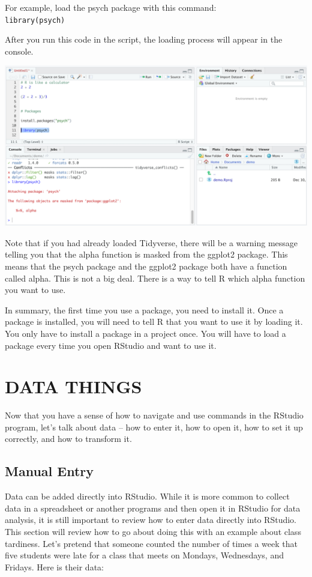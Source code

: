 \documentclass[
]{book}
\begin{document}
For example, load the psych package with this command:\\
\texttt{library(psych)}

After you run this code in the script, the loading process will appear in the console.

\includegraphics{img/NAVIGATING AND COMMANDS R118.png}

Note that if you had already loaded Tidyverse, there will be a warning message telling you that the alpha function is masked from the ggplot2 package. This means that the psych package and the ggplot2 package both have a function called alpha. This is not a big deal. There is a way to tell R which alpha function you want to use.

In summary, the first time you use a package, you need to install it. Once a package is installed, you will need to tell R that you want to use it by loading it. You only have to install a package in a project once. You will have to load a package every time you open RStudio and want to use it.

\hypertarget{data-things}{%
\section{DATA THINGS}\label{data-things}}

Now that you have a sense of how to navigate and use commands in the RStudio program, let's talk about data -- how to enter it, how to open it, how to set it up correctly, and how to transform it.

\hypertarget{manual-entry}{%
\subsection{Manual Entry}\label{manual-entry}}

Data can be added directly into RStudio. While it is more common to collect data in a spreadsheet or another programs and then open it in RStudio for data analysis, it is still important to review how to enter data directly into RStudio. This section will review how to go about doing this with an example about class tardiness. Let's pretend that someone counted the number of times a week that five students were late for a class that meets on Mondays, Wednesdays, and Fridays. Here is their data:
\end{document}
